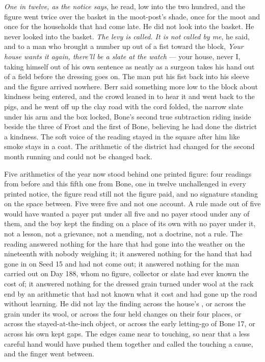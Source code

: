 \emph{One in twelve, as the notice says}, he read, low into the two hundred, and the figure went twice over the basket in the moot-post's shade, once for the moot and once for the households that had come late. He did not look into the basket. He never looked into the basket. \emph{The levy is called. It is not called by me}, he said, and to a man who brought a number up out of a fist toward the block, \emph{Your house wants it again, there'll be a slate at the watch} --- your house, never I, taking himself out of his own sentence as neatly as a surgeon takes his hand out of a field before the dressing goes on. The man put his fist back into his sleeve and the figure arrived nowhere. Berr said something more low to the block about kindness being entered, and the crowd leaned in to hear it and went back to the pigs, and he went off up the clay road with the cord folded, the narrow slate under his arm and the box locked, Bone's second true subtraction riding inside beside the three of Frost and the first of Bone, believing he had done the district a kindness. The soft voice of the reading stayed in the square after him like smoke stays in a coat. The arithmetic of the district had changed for the second month running and could not be changed back.

Five arithmetics of the year now stood behind one printed figure: four readings from before and this fifth one from Bone, one in twelve unchallenged in every printed notice, the figure read still not the figure paid, and no signature standing on the space between. Five were five and not one account. A rule made out of five would have wanted a payer put under all five and no payer stood under any of them, and the boy kept the finding on a place of its own with no payer under it, not a lesson, not a grievance, not a mending, not a doctrine, not a rule. The reading answered nothing for the hare that had gone into the weather on the nineteenth with nobody weighing it; it answered nothing for the hand that had gone in on Seed 15 and had not come out; it answered nothing for the man carried out on Day 188, whom no figure, collector or slate had ever known the cost of; it answered nothing for the dressed grain turned under wool at the rack end by an arithmetic that had not known what it cost and had gone up the road without learning. He did not lay the finding across the house's , or across the grain under its wool, or across the four held changes on their four places, or across the stayed-at-the-inch object, or across the early letting-go of Bone 17, or across his own kept gaps. The edges came near to touching, so near that a less careful hand would have pushed them together and called the touching a cause, and the finger went between.

